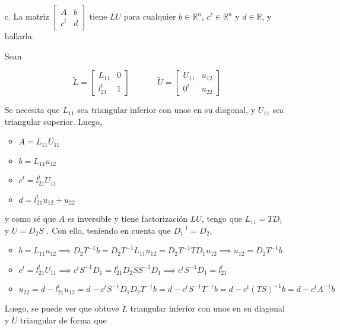 \begin{itemize}
    \item[c.] La matriz $\begin{bmatrix}
        A & b \\
        c^t & d
    \end{bmatrix}$ tiene $LU$ para cualquier $b \in \mathbb{R}^{n}$, $c^t \in \mathbb{R}^n$ y $d \in \mathbb{R}$, y hallarla.
    
    Sean
    
    \[
    \widetilde{L} =
    \begin{bmatrix}
        L_{11} & 0 \\
        l_{21}^{t} & 1
    \end{bmatrix}
    ~~~~~~~~~~~~~~~
    \widetilde{U} =
    \begin{bmatrix}
        U_{11} & u_{12} \\
        0^{t} & u_{22}
    \end{bmatrix}
    \]
    
    Se necesita que $L_{11}$ sea triangular inferior con unos en su diagonal, y $U_{11}$ sea triangular superior. Luego,
    
    \begin{itemize}
        \item $A = L_{11}U_{11}$
        \item $b = L_{11}u_{12}$
        \item $c^{t} = l_{21}^{t}U_{11}$
        \item $d = l_{21}^{t}u_{12} + u_{22}$
    \end{itemize}
    
    y como sé que $A$ es inversible y tiene factorización $LU$, tengo que $L_{11} = TD_1$ y $U = D_2 S$ . Con ello, teniendo en cuenta que $D_{1}^{-1} = D_2$,
    
    \begin{itemize}
        \item $b = L_{11}u_{12} \implies D_2 T^{-1}b = D_2 T^{-1}L_{11}u_{12} = D_2 T^{-1}TD_{1}u_{12} \implies u_{12} = D_2 T^{-1}b$
        \item $c^{t} = l_{21}^{t}U_{11} \implies c^{t}S^{-1}D_1 = l_{21}^{t}D_2 SS^{-1}D_1 \implies c^{t}S^{-1}D_1 = l_{21}^{t}$
        \item $u_{22} = d - l_{21}^{t}u_{12} = d- c^{t}S^{-1}D_1 D_2 T^{-1}b = d - c^{t}S^{-1}T^{-1}b = d - c^{t}{(TS)}^{-1}b = d - c^{t}A^{-1}b$
    \end{itemize}
    
    Luego, se puede ver que obtuve $\widetilde{L}$ triangular inferior con unos en su diagonal y $\widetilde{U}$ triangular de forma que
    

\end{itemize}
